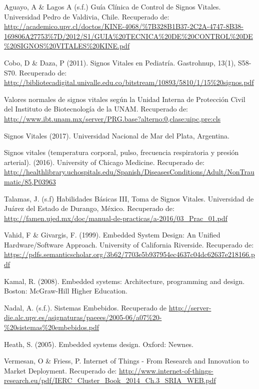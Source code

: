 \begin{thebibliography}{0}
	
	
	 Aguayo, A \& Lagos A (s.f.) Guía Clínica de Control de Signos Vitales. Universidad Pedro de Valdivia, Chile. Recuperado de: \url{http://academico.upv.cl/doctos/KINE-4068/\%7B328B1B37-2C2A-4747-8B38-169806A27753%7D/2012/S1/GUIA%20TECNICA%20DE%20CONTROL%20DE%20SIGNOS%20VITALES%20KINE.pdf}
	
	 Cobo, D \& Daza, P (2011). Signos Vitales en Pediatría. Gastrohnup, 13(1), S58-S70. Recuperado de: \url{http://bibliotecadigital.univalle.edu.co/bitstream/10893/5810/1/15%20signos.pdf} 
	
	 Valores normales de signos vitales según la Unidad Interna de Protección Civil del Instituto de Biotecnología de la UNAM. Recuperado de: \url{http://www.ibt.unam.mx/server/PRG.base?alterno:0,clase:uipc,pre:cls}
	
	 Signos Vitales (2017). Universidad Nacional de Mar del Plata, Argentina. 
	
	 Signos vitales (temperatura corporal, pulso, frecuencia respiratoria y presión arterial). (2016). University of Chicago Medicine. Recuperado de: \url{http://healthlibrary.uchospitals.edu/Spanish/DiseasesConditions/Adult/NonTraumatic/85,P03963}
	
	 Talamas, J. (s.f) Habilidades Básicas III, Toma de Signos Vitales. Universidad de Juárez del Estado de Durango, México. Recuperado de: \url{http://famen.ujed.mx/doc/manual-de-practicas/a-2016/03_Prac_01.pdf}
	
		Vahid, F \& Givargis, F. (1999). Embedded System Design: An Unified Hardware/Software Approach. University of California Riverside. Recuperado de: \url{https://pdfs.semanticscholar.org/3b62/7703e5b937954ec4637c04dc62637e218166.pdf}
	
	 Kamal, R. (2008). Embedded systems: Architecture, programming and design. Boston: McGraw-Hill Higher Education.
	
	 Nadal, A. (s.f.). Sistemas Embebidos. Recuperado de  \url{http://server-die.alc.upv.es/asignaturas/paeees/2005-06/a07%20-%20sistemas%20embebidos.pdf}
	
	 Heath, S. (2005). Embedded systems design. Oxford: Newnes.
	
	 Vermesan, O \& Friess, P. Internet of Things - From Research and Innovation to Market Deployment. Recuperado de:  \url{http://www.internet-of-things-research.eu/pdf/IERC_Cluster_Book_2014_Ch.3_SRIA_WEB.pdf}
	

\end{thebibliography}
